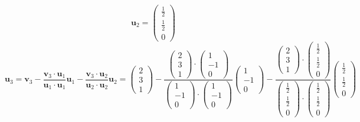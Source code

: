 \documentclass[a3paper,12pt]{extarticle} %
\begin{document}
\begin{enumerate}
\begin{enumerate}
\[        \]
        \[
            \mathbf{u}_2 = \begin{pmatrix} \frac{1}{2} \\ \frac{1}{2} \\ 0 \end{pmatrix}
        \]
        \[
            \mathbf{u}_3 = \mathbf{v}_3 - \frac{\mathbf{v}_3 \cdot \mathbf{u}_1}{\mathbf{u}_1 \cdot \mathbf{u}_1} \mathbf{u}_1 - \frac{\mathbf{v}_3 \cdot \mathbf{u}_2}{\mathbf{u}_2 \cdot \mathbf{u}_2} \mathbf{u}_2 = \begin{pmatrix} 2 \\ 3 \\ 1 \end{pmatrix} - \frac{\begin{pmatrix} 2 \\ 3 \\ 1 \end{pmatrix} \cdot \begin{pmatrix} 1 \\ -1 \\ 0 \end{pmatrix}}{\begin{pmatrix} 1 \\ -1 \\ 0 \end{pmatrix} \cdot \begin{pmatrix} 1 \\ -1 \\ 0 \end{pmatrix}} \begin{pmatrix} 1 \\ -1 \\ 0 \end{pmatrix} - \frac{\begin{pmatrix} 2 \\ 3 \\ 1 \end{pmatrix} \cdot \begin{pmatrix} \frac{1}{2} \\ \frac{1}{2} \\ 0 \end{pmatrix}}{\begin{pmatrix} \frac{1}{2} \\ \frac{1}{2} \\ 0 \end{pmatrix} \cdot \begin{pmatrix} \frac{1}{2} \\ \frac{1}{2} \\ 0 \end{pmatrix}} \begin{pmatrix} \frac{1}{2} \\ \frac{1}{2} \\ 0 \end{pmatrix}
\]
\end{enumerate}
\end{enumerate}
\end{document}
